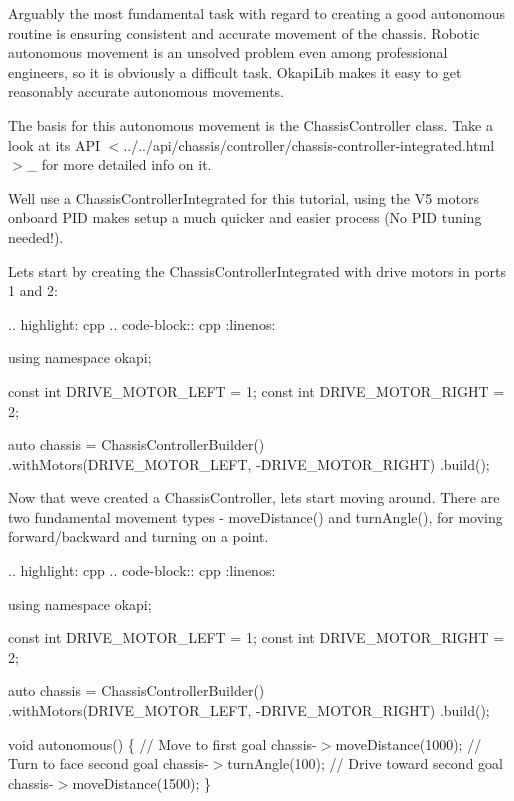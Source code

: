 Arguably the most fundamental task with regard to creating a good autonomous routine is ensuring consistent and accurate movement of the chassis. Robotic autonomous movement is an unsolved problem even among professional engineers, so it is obviously a difficult task. Okapi\+Lib makes it easy to get reasonably accurate autonomous movements.

The basis for this autonomous movement is the Chassis\+Controller class. Take a look at its {\ttfamily A\+PI $<$../../api/chassis/controller/chassis-\/controller-\/integrated.html$>$}\+\_\+ for more detailed info on it.

We\textquotesingle{}ll use a {\ttfamily Chassis\+Controller\+Integrated} for this tutorial, using the V5 motors\textquotesingle{} onboard P\+ID makes setup a much quicker and easier process (No P\+ID tuning needed!).

Let\textquotesingle{}s start by creating the {\ttfamily Chassis\+Controller\+Integrated} with drive motors in ports 1 and 2\+:

.. highlight\+: cpp .. code-\/block\+:: cpp \+:linenos\+:

using namespace okapi;

const int D\+R\+I\+V\+E\+\_\+\+M\+O\+T\+O\+R\+\_\+\+L\+E\+FT = 1; const int D\+R\+I\+V\+E\+\_\+\+M\+O\+T\+O\+R\+\_\+\+R\+I\+G\+HT = 2;

auto chassis = Chassis\+Controller\+Builder() .with\+Motors(D\+R\+I\+V\+E\+\_\+\+M\+O\+T\+O\+R\+\_\+\+L\+E\+FT, -\/D\+R\+I\+V\+E\+\_\+\+M\+O\+T\+O\+R\+\_\+\+R\+I\+G\+HT) .build();

Now that we\textquotesingle{}ve created a Chassis\+Controller, let\textquotesingle{}s start moving around. There are two fundamental movement types -\/ {\ttfamily move\+Distance()} and {\ttfamily turn\+Angle()}, for moving forward/backward and turning on a point.

.. highlight\+: cpp .. code-\/block\+:: cpp \+:linenos\+:

using namespace okapi;

const int D\+R\+I\+V\+E\+\_\+\+M\+O\+T\+O\+R\+\_\+\+L\+E\+FT = 1; const int D\+R\+I\+V\+E\+\_\+\+M\+O\+T\+O\+R\+\_\+\+R\+I\+G\+HT = 2;

auto chassis = Chassis\+Controller\+Builder() .with\+Motors(D\+R\+I\+V\+E\+\_\+\+M\+O\+T\+O\+R\+\_\+\+L\+E\+FT, -\/D\+R\+I\+V\+E\+\_\+\+M\+O\+T\+O\+R\+\_\+\+R\+I\+G\+HT) .build();

void autonomous() \{ // Move to first goal chassis-\/$>$move\+Distance(1000); // Turn to face second goal chassis-\/$>$turn\+Angle(100); // Drive toward second goal chassis-\/$>$move\+Distance(1500); \}

